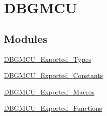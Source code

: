 \hypertarget{group__DBGMCU}{
\section{DBGMCU}
\label{group__DBGMCU}
}
\subsection*{Modules}
\begin{DoxyCompactItemize}
\item 
\hyperlink{group__DBGMCU__Exported__Types}{DBGMCU\_\-Exported\_\-Types}
\item 
\hyperlink{group__DBGMCU__Exported__Constants}{DBGMCU\_\-Exported\_\-Constants}
\item 
\hyperlink{group__DBGMCU__Exported__Macros}{DBGMCU\_\-Exported\_\-Macros}
\item 
\hyperlink{group__DBGMCU__Exported__Functions}{DBGMCU\_\-Exported\_\-Functions}
\end{DoxyCompactItemize}
